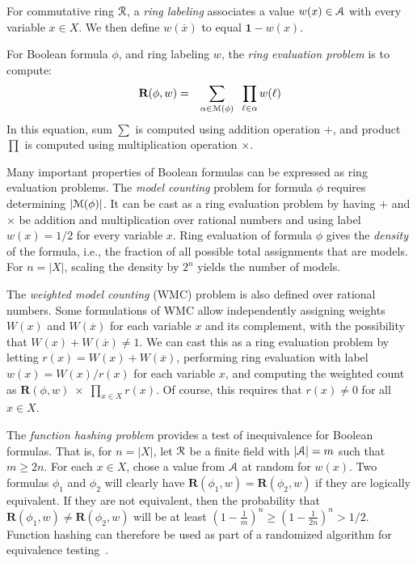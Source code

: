 \documentclass[letterpaper,USenglish,cleveref, autoref, thm-restate]{lipics-v2021}
\newcommand{\obar}[1]{\overline{#1}}
\newcommand{\lit}{\ell}
\newcommand{\varset}{X}
\newcommand{\ring}{{\cal R}}
\newcommand{\dset}{{\cal A}}
\newcommand{\rep}{\textbf{R}}
\newcommand{\radd}{+}
\newcommand{\rmul}{\times}
\newcommand{\mulident}{\textbf{1}}
\newcommand{\modelset}{{\cal M}}
\begin{document}
\begin{definition}
\label{def:ring_evaluation}
  For commutative ring $\ring$, a {\em ring labeling} associates a value $w(x) \in \dset$ with
  every variable $x \in \varset$.  We then define $w(\obar{x})$ to equal $\mulident-w(x)$.

  For Boolean formula $\phi$, and ring labeling $w$, the {\em ring evaluation problem} is to compute:
  \begin{eqnarray}
    \rep(\phi, w) & = & \sum_{\alpha \in \modelset(\phi)} \;\; \prod_{\lit \in \alpha} w(\ell) \label{eqn:rep}
  \end{eqnarray}
  In this equation, sum $\sum$ is computed using addition operation $\radd$, and product $\prod$ is computed using multiplication operation $\rmul$.
\label{def:labeling}
\end{definition}

Many important properties of Boolean formulas can be
expressed as ring evaluation problems.  The
{\em model counting} problem for formula $\phi$ requires determining $|\modelset(\phi)|$.
It can be cast as a ring evaluation problem by having $\radd$ and
$\rmul$ be addition and multiplication over rational numbers and using
label $w(x) = 1/2$ for every variable $x$.
Ring evaluation of formula $\phi$ gives the {\em density} of
the formula, i.e., the fraction of all possible total assignments that are
models.  For $n = |\varset|$, scaling the density by $2^n$ 
yields the number of models.

The {\em weighted model counting} (WMC) problem is also defined over
rational numbers.  Some formulations of WMC allow
independently assigning weights $W(x)$ and $W(\obar{x})$ for each variable $x$ and its complement, with the possibility that
$W(x) + W(\obar{x}) \not = 1$.
We can cast this as a
ring evaluation problem by letting $r(x) = W(x) + W(\obar{x})$,
performing ring evaluation with label $w(x) = W(x)/r(x)$ for each
variable $x$, and computing the weighted count
as $\rep(\phi, w)\; \rmul\; \prod_{x \in \varset} r(x)$.
Of course, this requires that $r(x) \not = 0$ for all $x \in \varset$.

The {\em function hashing problem} provides a test
of inequivalence for Boolean formulas.  That is, for $n = |\varset|$, let $\ring$ be a
finite  field with $|\dset| = m$ such that $m \geq 2 n$.  For each $x \in \varset$, chose a value from $\dset$ at random for $w(x)$.  Two formulas
$\phi_1$ and $\phi_2$ will clearly have $\rep(\phi_1, w) = \rep(\phi_2, w)$
if they are logically equivalent.  If they are not equivalent, then
the probability that $\rep(\phi_1, w) \not = \rep(\phi_2, w)$ will be at
least $\left(1-\frac{1}{m}\right)^n \geq \left(1-\frac{1}{2n}\right)^n > 1/2$.
Function hashing can therefore be used as part of a
randomized algorithm for equivalence testing~\cite{blum:ipl:1980}.
\end{document}
